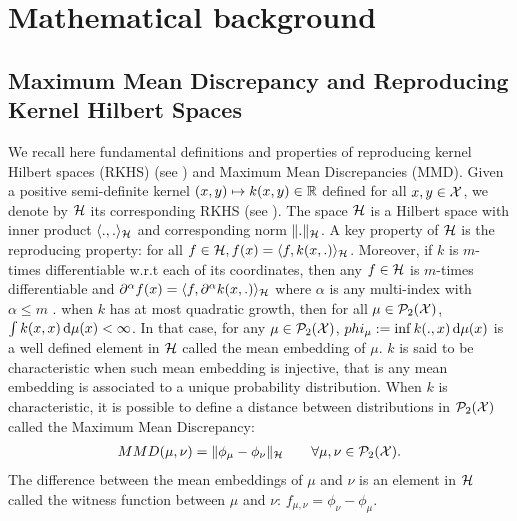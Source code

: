 


\section{Mathematical background}

\subsection{Maximum Mean Discrepancy and Reproducing Kernel Hilbert Spaces}\label{sec:rkhs}
We recall here fundamental definitions and properties of reproducing kernel Hilbert spaces (RKHS) (see \cite{smola1998learning}) and Maximum Mean Discrepancies (MMD). 
Given a positive semi-definite kernel $(x,y)\mapsto k(x,y)\in {{\mathbb R}}$ defined for all $x,y\in{{\mathcal X}}$, we denote by ${{\mathcal H}}$ its corresponding RKHS (see \cite{smola1998learning}). The space ${{\mathcal H}}$ is a Hilbert space with inner product $\langle .,. \rangle_{{{\mathcal H}}}$ and corresponding norm $\Vert . \Vert_{{{\mathcal H}}}$. A key property of ${{\mathcal H}}$ is the reproducing property: for all $f \in {{\mathcal H}}, f(x) = \langle f, k(x, .)\rangle_{{{\mathcal H}}}$. Moreover, if $k$ is $m$-times differentiable w.r.t each of its coordinates, then any $f\in {{\mathcal H}}$  is $m$-times differentiable  and $\partial^{\alpha}f(x)=\langle f, \partial^{\alpha} k(x,.) \rangle_{{{\mathcal H}}}$ where $\alpha$ is any multi-index with $\alpha \leq m$ \cite[Lemma 4.34]{Steinwart:2008a}. when $k$ has at most quadratic growth, then for all $\mu\in \mathcal{P}_2({{\mathcal X}})$, $\int k(x,x) \mathop{}\!\mathrm{d} \mu(x) <\infty$. In that case, for any $\mu\in \mathcal{P}_2({{\mathcal X}})$,  $ phi_{\mu} := \inf k(.,x)\mathop{}\!\mathrm{d} \mu(x)$ is a well defined element in ${{\mathcal H}}$ called the mean embedding of $\mu$. $k$ is said to be characteristic when such mean embedding is injective, that is any mean embedding is associated to a unique probability distribution. When $k$ is characteristic, it is possible to define a distance between distributions in $\mathcal{P}_2({{\mathcal X}})$ called the Maximum Mean Discrepancy:
\begin{align}
	MMD(\mu,\nu) = \Vert \phi_{\mu} - \phi_{\nu}\Vert_{{{\mathcal H}}} \qquad \forall \mu,\nu \in \mathcal{P}_2({{\mathcal X}}).
\end{align}
The difference between the mean embeddings of $\mu$ and $\nu$ is an element in ${{\mathcal H}}$ called the witness function between $\mu$ and $\nu$:  $f_{\mu,\nu} = \phi_{\nu} - \phi_{\mu}$.

